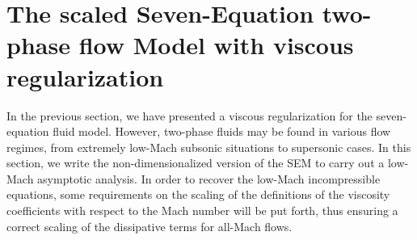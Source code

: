 \documentclass[preprint,10pt]{elsarticle}
\begin{document}
\section{The scaled Seven-Equation two-phase flow Model with viscous regularization}\label{sec:low-Mach}
%
In the previous section, we have presented a viscous regularization for the seven-equation fluid model.  However,
two-phase fluids may be found in various flow regimes, from extremely low-Mach subsonic situations to supersonic cases.
In this section, we write the non-dimensionalized version of the SEM to carry out a low-Mach asymptotic analysis. In order to 
recover the low-Mach incompressible equations, some requirements on the scaling of the definitions of the viscosity coefficients 
with respect to the Mach number will be put forth, thus ensuring a correct scaling of the dissipative terms for all-Mach flows.
\end{document}
